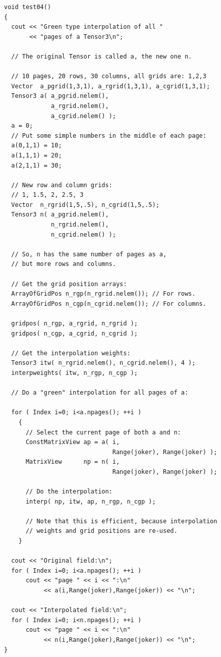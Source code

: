 {\small
\begin{verbatim}
void test04()
{
  cout << "Green type interpolation of all "
       << "pages of a Tensor3\n";

  // The original Tensor is called a, the new one n. 

  // 10 pages, 20 rows, 30 columns, all grids are: 1,2,3
  Vector  a_pgrid(1,3,1), a_rgrid(1,3,1), a_cgrid(1,3,1); 
  Tensor3 a( a_pgrid.nelem(),
             a_rgrid.nelem(),
             a_cgrid.nelem() ); 
  a = 0;
  // Put some simple numbers in the middle of each page:
  a(0,1,1) = 10;
  a(1,1,1) = 20;
  a(2,1,1) = 30;

  // New row and column grids:
  // 1, 1.5, 2, 2.5, 3
  Vector  n_rgrid(1,5,.5), n_cgrid(1,5,.5); 
  Tensor3 n( a_pgrid.nelem(),
             n_rgrid.nelem(),
             n_cgrid.nelem() ); 

  // So, n has the same number of pages as a, 
  // but more rows and columns.

  // Get the grid position arrays:
  ArrayOfGridPos n_rgp(n_rgrid.nelem()); // For rows.
  ArrayOfGridPos n_cgp(n_cgrid.nelem()); // For columns.

  gridpos( n_rgp, a_rgrid, n_rgrid );
  gridpos( n_cgp, a_cgrid, n_cgrid );

  // Get the interpolation weights:
  Tensor3 itw( n_rgrid.nelem(), n_cgrid.nelem(), 4 );
  interpweights( itw, n_rgp, n_cgp );

  // Do a "green" interpolation for all pages of a:

  for ( Index i=0; i<a.npages(); ++i )
    {
      // Select the current page of both a and n:
      ConstMatrixView ap = a( i,
                              Range(joker), Range(joker) );
      MatrixView      np = n( i,
                              Range(joker), Range(joker) );

      // Do the interpolation:
      interp( np, itw, ap, n_rgp, n_cgp );

      // Note that this is efficient, because interpolation
      // weights and grid positions are re-used.
    }

  cout << "Original field:\n";
  for ( Index i=0; i<a.npages(); ++i )
      cout << "page " << i << ":\n"
           << a(i,Range(joker),Range(joker)) << "\n";

  cout << "Interpolated field:\n";
  for ( Index i=0; i<n.npages(); ++i )
      cout << "page " << i << ":\n"
           << n(i,Range(joker),Range(joker)) << "\n";
}
\end{verbatim}
}

